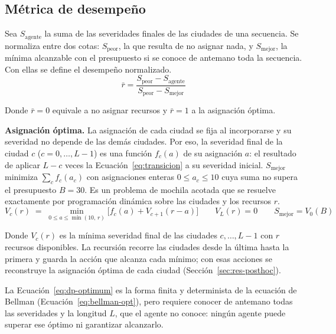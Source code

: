 \documentclass[../00_Main/Main.tex]{subfiles}
\begin{document}
\subsection{M\'etrica de desempe\~no}\label{sec:metric}

Sea $S_{\mathrm{agente}}$ la suma de las severidades finales de las
ciudades de una secuencia. Se normaliza entre dos cotas:
$S_{\mathrm{peor}}$, la que resulta de no asignar nada, y
$S_{\mathrm{mejor}}$, la m\'inima alcanzable con el presupuesto si se conoce
de antemano toda la secuencia. Con ellas se define el desempe\~no normalizado.
\begin{equation}
\bar{r} =
\frac{S_{\mathrm{peor}} - S_{\mathrm{agente}}}
{S_{\mathrm{peor}} - S_{\mathrm{mejor}}}
\label{eq:normalised-severity-materials}
\end{equation}

Donde $\bar r = 0$ equivale a no asignar recursos y $\bar r = 1$ a la
asignaci\'on \'optima.

\textbf{Asignaci\'on \'optima.} La asignaci\'on de cada ciudad se fija al
incorporarse y su severidad no depende de las dem\'as ciudades. Por eso,
la severidad final de la ciudad $c$ ($c = 0, \ldots, L-1$) es una funci\'on
$f_c(a)$ de su asignaci\'on $a$: el resultado de aplicar $L - c$ veces la
Ecuaci\'on~\eqref{eq:transicion} a su severidad inicial. $S_{\mathrm{mejor}}$
minimiza $\sum_c f_c(a_c)$ con asignaciones enteras $0 \le a_c \le 10$ cuya
suma no supera el presupuesto $B = 30$. Es un problema de mochila acotada
que se resuelve exactamente por programaci\'on din\'amica sobre las
ciudades y los recursos $r$.
\begin{equation}
V_c(r) \;=\; \min_{0 \le a \le \min(10,\, r)} \bigl[f_c(a) + V_{c+1}(r - a)\bigr]
\qquad V_L(r) = 0 \qquad S_{\mathrm{mejor}} = V_0(B)
\label{eq:dp-optimum}
\end{equation}

Donde $V_c(r)$ es la m\'inima severidad final de las ciudades
$c, \ldots, L-1$ con $r$ recursos disponibles. La recursi\'on recorre las
ciudades desde la \'ultima hasta la primera y guarda la acci\'on que
alcanza cada m\'inimo; con esas acciones se reconstruye la asignaci\'on
\'optima de cada ciudad (Secci\'on~\ref{sec:res-posthoc}).

La Ecuaci\'on~\eqref{eq:dp-optimum} es la forma finita y determinista de
la ecuaci\'on de Bellman (Ecuaci\'on~\eqref{eq:bellman-opt}), pero
requiere conocer de antemano todas las severidades y la longitud $L$, que
el agente no conoce: ning\'un agente puede superar ese \'optimo ni
garantizar alcanzarlo.
\end{document}
